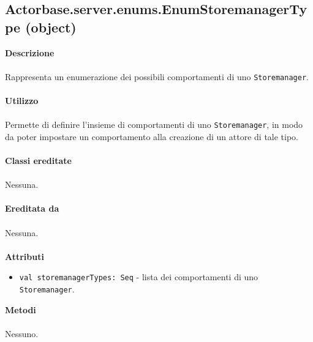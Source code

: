 \documentclass[a4paper]{article}
\begin{document}
			\subsection{Actorbase.server.enums.EnumStoremanagerType (object)}
		\textbf{Descrizione}
			\\ \\
			Rappresenta un enumerazione dei possibili comportamenti di uno \texttt{Storemanager}.
			\\ \\
		\textbf{Utilizzo}
			\\ \\
			Permette di definire l'insieme di comportamenti di uno \texttt{Storemanager}, in modo da poter impostare un comportamento alla creazione di un attore di tale tipo.
			\\ \\
		\textbf{Classi ereditate}
		\\ \\
			Nessuna.
		\\ \\
		\textbf{Ereditata da}
		\\ \\
			Nessuna.
		\\ \\
		\textbf{Attributi}
			\begin{itemize}
				\item \texttt{val storemanagerTypes: Seq} - lista dei comportamenti di uno \texttt{Storemanager}.
			\end{itemize}
		\textbf{Metodi}
			\\ \\
			Nessuno.
	
			
\end{document}
